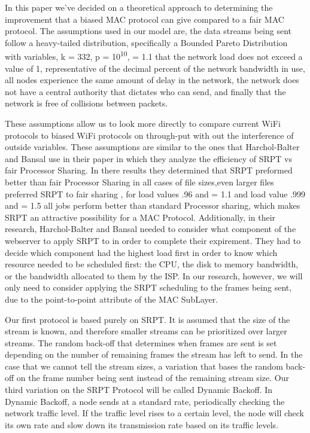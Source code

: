 \documentclass{sigcomm-alternate}
\begin{document}
In this paper we've decided on a theoretical approach to determining the improvement that a biased MAC protocol can give compared to a fair MAC protocol. The assumptions used in our model are, the data streams being sent follow a heavy-tailed distribution, specifically a Bounded Pareto Distribution with variables, k = 332, p = 10\textsuperscript{10}, \textalpha  = 1.1
 that the network load does not exceed a value of 1, representative of the decimal percent of the network bandwidth in use, all nodes experience the same amount of delay in the network, the network does not have a central authority that dictates who can send, and finally that the network is free of collisions between packets. 

These assumptions allow us to look more directly to compare current WiFi protocols to biased WiFi protocols on through-put with out the interference of outside variables. These assumptions are similar to the ones that Harchol-Balter and Bansal use in their paper \cite{Unfair} in which they analyze the efficiency of SRPT vs fair Processor Sharing. In there results they determined that SRPT preformed better than fair Processor Sharing in all cases of file sizes,even larger files preferred SRPT to fair sharing \cite{Unfair}, for load values .96 and \textalpha = 1.1 and load value .999 and \textalpha= 1.5 all jobs perform better than standard Processor sharing, which makes SRPT an attractive possibility for a MAC Protocol. Additionally, in their research, Harchol-Balter and Bansal needed to consider what component of the webserver to apply SRPT to in order to complete their expirement. They had to decide which component had the highest load first in order to know which resource needed to be scheduled first: the CPU, the disk to memory bandwidth, or the bandwidth allocated to them by the ISP. In our research, however, we will only need to consider applying the SRPT scheduling to the frames being sent, due to the point-to-point attribute of the MAC SubLayer. 

Our first protocol is based purely on SRPT. It is assumed that the size of the stream is known, and therefore smaller streams can be prioritized over larger streams. The random back-off that determines when frames are sent is set depending on the number of remaining frames the stream has left to send. In the case that we cannot tell the stream sizes, a variation that bases the random back-off on the frame number being sent instead of the remaining stream size. Our third variation on the SRPT Protocol will be called Dynamic Backoff. In Dynamic Backoff, a node sends at a standard rate, periodically checking the network traffic level. If the traffic level rises to a certain level, the node will check its own rate and slow down its transmission rate based on its traffic levels. 
\end{document}
